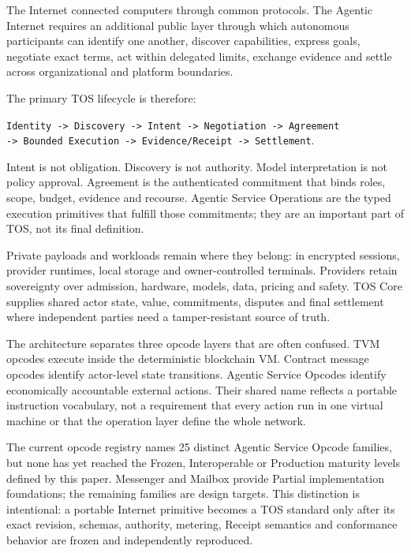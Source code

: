 \documentclass[11pt,oneside]{article}
\begin{document}
The Internet connected computers through common protocols. The Agentic Internet requires an
additional public layer through which autonomous participants can identify one another,
discover capabilities, express goals, negotiate exact terms, act within delegated limits,
exchange evidence and settle across organizational and platform boundaries.

The primary TOS lifecycle is therefore:

\begin{center}
\texttt{Identity -> Discovery -> Intent -> Negotiation -> Agreement}\\
\texttt{-> Bounded Execution -> Evidence/Receipt -> Settlement}.
\end{center}

Intent is not obligation. Discovery is not authority. Model interpretation is not policy
approval. Agreement is the authenticated commitment that binds roles, scope, budget,
evidence and recourse. Agentic Service Operations are the typed execution primitives that
fulfill those commitments; they are an important part of TOS, not its final definition.

Private payloads and workloads remain where they belong: in encrypted sessions, provider
runtimes, local storage and owner-controlled terminals. Providers retain sovereignty over
admission, hardware, models, data, pricing and safety. TOS Core supplies shared actor state,
value, commitments, disputes and final settlement where independent parties need a
tamper-resistant source of truth.

The architecture separates three opcode layers that are often confused. TVM opcodes execute
inside the deterministic blockchain VM. Contract message opcodes identify actor-level state
transitions. Agentic Service Opcodes identify economically accountable external actions.
Their shared name reflects a portable instruction vocabulary, not a requirement that every
action run in one virtual machine or that the operation layer define the whole network.

The current opcode registry names 25 distinct Agentic Service Opcode families, but none has
yet reached the Frozen, Interoperable or Production maturity levels defined by this paper.
Messenger and Mailbox provide Partial implementation foundations; the remaining families are
design targets. This distinction is intentional: a portable Internet primitive becomes a TOS
standard only after its exact revision, schemas, authority, metering, Receipt semantics and
conformance behavior are frozen and independently reproduced.
\end{document}
